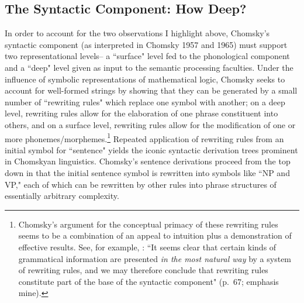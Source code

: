 \subsection{The Syntactic Component: How Deep?}
In order to account for the two observations I highlight above, Chomsky's syntactic component (as interpreted in Chomsky 1957 and 1965) must support two representational levels-- a ``surface" level fed to the phonological component and a ``deep" level given as input to the semantic processing faculties.  Under the influence of symbolic representations of mathematical logic, Chomsky seeks to account for well-formed strings by showing that they can be generated by a small number of ``rewriting rules" which replace one symbol with another; on a deep level, rewriting rules allow for the elaboration of one phrase constituent into others, and on a surface level, rewriting rules allow for the modification of one or more phonemes/morphemes.\footnote{Chomsky's argument for the conceptual primacy of these rewriting rules seems to be a combination of an appeal to intuition plus a demonstration of effective results.  See, for example, \cite{chomsky1965}: ``It seems clear that certain kinds of grammatical information are presented \emph{in the most natural way} by a system of rewriting rules, and we may therefore conclude that rewriting rules constitute part of the base of the syntactic component" (p.\ 67; emphasis mine).}  Repeated application of rewriting rules from an initial symbol for ``sentence" yields the iconic syntactic derivation trees prominent in Chomskyan linguistics.  Chomsky's sentence derivations proceed from the top down in that the initial sentence symbol is rewritten into symbols like ``NP and VP," each of which can be rewritten by other rules into phrase structures of essentially arbitrary complexity.

